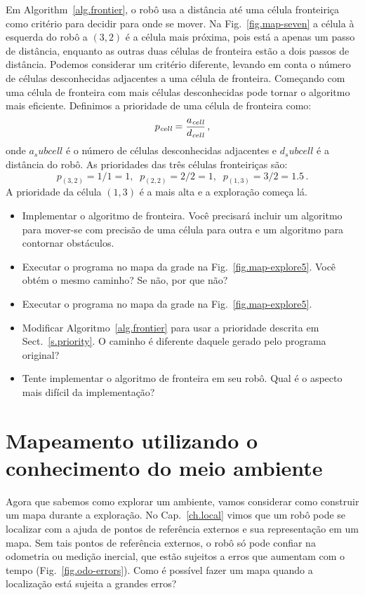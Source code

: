 Em Algorithm~\ref{alg.frontier}, o robô usa a distância até uma célula fronteiriça como critério para decidir para onde se mover. Na Fig.~\ref{fig.map-seven} a célula à esquerda do robô a $(3,2)$ é a célula mais próxima, pois está a apenas um passo de distância, enquanto as outras duas células de fronteira estão a dois passos de distância. Podemos considerar um critério diferente, levando em conta o número de células desconhecidas adjacentes a uma célula de fronteira. Começando com uma célula de fronteira com mais células desconhecidas pode tornar o algoritmo mais eficiente. Definimos a prioridade de uma célula de fronteira como:
\[
p_{\textit{\scriptsize cell}} = \frac{a_{\textit{\scriptsize cell}}}{d_{\textit{\scriptsize cell}}}\,,
\]
onde $a_sub{cell}$ é o número de células desconhecidas adjacentes e $d_sub{cell}$ é a distância do robô. As prioridades das três células fronteiriças são:
\[
p_{(3,2)} = 1/1 = 1,\;\;p_{(2,2)} = 2/2 = 1,\;\;p_{(1,3)} = 3/2 = 1.5\,.
\]
A prioridade da célula $(1,3)$ é a mais alta e a exploração começa lá.

\begin{framed}
\begin{itemize}
\item Implementar o algoritmo de fronteira. Você precisará incluir um algoritmo para mover-se com precisão de uma célula para outra e um algoritmo para contornar obstáculos.
\item Executar o programa no mapa da grade na Fig.~\ref{fig.map-explore5}. Você obtém o mesmo caminho? Se não, por que não?
\item Executar o programa no mapa da grade na Fig.~\ref{fig.map-explore5}.
\item Modificar Algoritmo~\ref{alg.frontier} para usar a prioridade descrita em Sect.~\ref{s.priority}. O caminho é diferente daquele gerado pelo programa original?
\item Tente implementar o algoritmo de fronteira em seu robô. Qual é o aspecto mais difícil da implementação?
\end{itemize}
\end{framed}

\section{Mapeamento utilizando o conhecimento do meio ambiente}\label{s.map-update}

Agora que sabemos como explorar um ambiente, vamos considerar como construir um mapa durante a exploração. No Cap.~\ref{ch.local} vimos que um robô pode se localizar com a ajuda de pontos de referência externos e sua representação em um mapa. Sem tais pontos de referência externos, o robô só pode confiar na odometria ou medição inercial, que estão sujeitos a erros que aumentam com o tempo (Fig.~\ref{fig.odo-errors}). Como é possível fazer um mapa quando a localização está sujeita a grandes erros?

